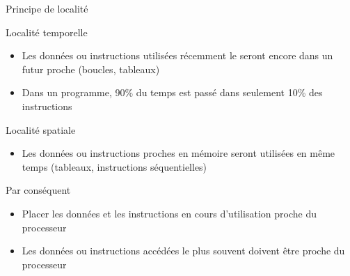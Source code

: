 %
\begin{Frame}{Principe de localité}

  \begin{block}{Localité temporelle}
    \begin{center}
 	\begin{itemize}
        \item Les données ou instructions utilisées récemment le seront encore dans un futur proche (boucles, tableaux)
        \item Dans un programme, 90\% du temps est passé dans seulement 10\% des instructions
        \end{itemize}
    \end{center}
  \end{block}   

  \begin{block}{Localité spatiale}
    \begin{center}
 	\begin{itemize}
        \item Les données ou instructions proches en mémoire seront utilisées en même temps (tableaux, instructions séquentielles)
        \end{itemize}
    \end{center}
  \end{block}   

  \begin{alertblock}{Par conséquent}
    \begin{center}
 	\begin{itemize}
        \item Placer les données et les instructions en cours d'utilisation proche du processeur
        \item Les données ou instructions accédées le plus souvent doivent être proche du processeur
        \end{itemize}
    \end{center}
  \end{alertblock}   

\end{Frame}


